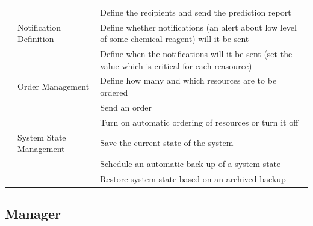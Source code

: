 \documentclass[a4paper,11pt,twoside]{report}
\theoremstyle{definition}
\begin{document}
\begin{longtable}{|p{3cm}|p{3cm}|p{10cm}|}
\texttt{} & & Define the recipients and send the prediction report \\ \cline{2-3}
\texttt{} & Notification \mbox{Definition} & Define whether notifications (an alert about low level of some chemical reagent) will it be sent\\ \cline{3-3}
\texttt{} & & Define when the notifications will it be sent (set the value which is critical for each reasource)\\ \cline{2-3}
\texttt{} & Order \mbox{Management} & Define how many and which resources are to be ordered\\ \cline{3-3}


\texttt{} & & Send an order\\ \cline{3-3}


\texttt{} & & Turn on automatic ordering of resources or turn it off\\ \cline{2-3}
\texttt{} & System State \mbox{Management} & Save the current state of the system\\ \cline{3-3}
\texttt{} & & Schedule an automatic back-up of a system state\\ \cline{3-3}
\texttt{} & & Restore system state based on an archived backup\\ \hline


\end{longtable}

\subsection{Manager}
\end{document}
